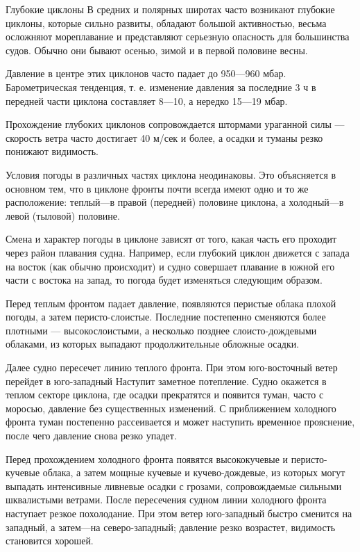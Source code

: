 Глубокие циклоны
В средних и полярных широтах часто возникают глубокие циклоны, которые сильно развиты, обладают большой активностью, весьма осложняют мореплавание и представляют серьезную опасность для большинства судов. Обычно они бывают осенью, зимой и в первой половине весны.

Давление в центре этих циклонов часто падает до 950—960 мбар. Барометрическая тенденция, т. е. изменение давления за последние 3 ч в передней части циклона составляет 8—10, а нередко 15—19 мбар.

Прохождение глубоких циклонов сопровождается штормами ураганной силы — скорость ветра часто достигает 40 м/сек и более, а осадки и туманы резко понижают видимость.

Условия погоды в различных частях циклона неодинаковы. Это объясняется в основном тем, что в циклоне фронты почти всегда имеют одно и то же расположение: теплый—в правой (передней) половине циклона, а холодный—в левой (тыловой) половине.

Смена и характер погоды в циклоне зависят от того, какая часть его проходит через район плавания судна. Например, если глубокий циклон движется с запада на восток (как обычно происходит) и судно совершает плавание в южной его части с востока на запад, то погода будет изменяться следующим образом.

Перед теплым фронтом падает давление, появляются перистые облака плохой погоды, а затем перисто-слоистые. Последние постепенно сменяются более плотными — высокослоистыми, а несколько позднее слоисто-дождевыми облаками, из которых выпадают продолжительные обложные осадки.

Далее судно пересечет линию теплого фронта. При этом юго-восточный ветер перейдет в юго-западный Наступит заметное потепление. Судно окажется в теплом секторе циклона, где осадки прекратятся и появится туман, часто с моросью, давление без существенных изменений. С приближением холодного фронта туман постепенно рассеивается и может наступить временное прояснение, после чего давление снова резко упадет.

Перед прохождением холодного фронта появятся высококучевые и перисто-кучевые облака, а затем мощные кучевые и кучево-дождевые, из которых могут выпадать интенсивные ливневые осадки с грозами, сопровождаемые сильными шквалистыми ветрами. После пересечения судном линии холодного фронта наступает резкое похолодание. При этом ветер юго-западный быстро сменится на западный, а затем—на северо-западный; давление резко возрастет, видимость становится хорошей.

